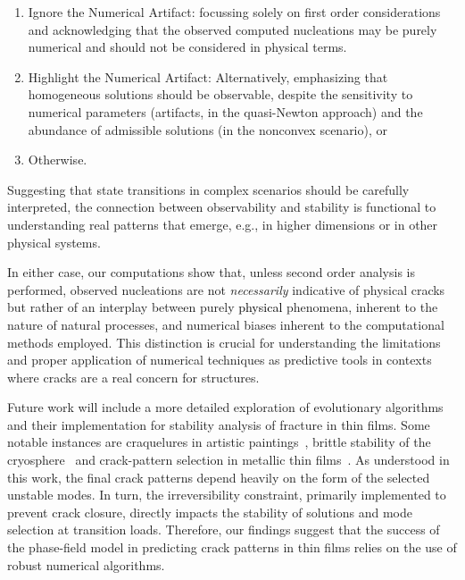 \documentclass[10pt]{article}
\begin{document}
\begin{enumerate}
    \item 
    Ignore the Numerical Artifact: focussing solely on first order considerations and acknowledging that the observed computed nucleations may be purely numerical and should not be considered in physical terms.
    \item 
    Highlight the Numerical Artifact: Alternatively, emphasizing that homogeneous solutions should be observable, despite 
    the sensitivity to numerical parameters (artifacts, in the quasi-Newton approach) and the abundance of admissible solutions (in the nonconvex scenario), or
    \item 
    Otherwise.
\end{enumerate}

Suggesting that state transitions in complex scenarios should be carefully interpreted, the connection between observability and stability is functional to understanding real patterns that emerge, e.g., in higher dimensions or in other physical systems.

In either case, our computations show that, unless second order analysis is performed, observed nucleations are not \emph{necessarily} indicative of physical cracks but rather of an interplay between purely   \textcolor{black}{physical} phenomena, inherent to the nature of natural processes, and numerical biases inherent to the computational methods employed. This distinction is crucial for understanding the limitations and proper application of numerical techniques as predictive tools in contexts where cracks are a real concern for structures.


Future work will include a more detailed exploration of evolutionary algorithms and their implementation for stability analysis of fracture in thin films. Some notable instances are craquelures in artistic paintings~\cite{fuster-lopez:2020-picassos, Bosco:2020aa,Bosco:2021},  brittle stability of the cryosphere~\cite{weiss:2017-linking, tollefson:2017-giant, Sun:2023aa, Millan:2023aa} and crack-pattern selection in metallic thin films~\cite{Faurie2019-to}. {As understood in this work, the final crack patterns depend heavily on the form of the selected unstable modes. In turn, the irreversibility constraint, primarily implemented to prevent crack closure, directly impacts the stability of solutions and mode selection at transition loads. Therefore, our findings suggest that the success of the phase-field model in predicting crack patterns in thin films relies on the use of robust numerical algorithms.}
\end{document}
